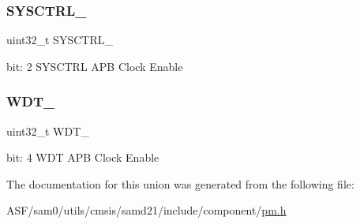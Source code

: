\subsubsection{\texorpdfstring{SYSCTRL\_}{SYSCTRL\_}}
{\footnotesize\ttfamily uint32\+\_\+t S\+Y\+S\+C\+T\+R\+L\+\_\+}

bit\+: 2 S\+Y\+S\+C\+T\+RL A\+PB Clock Enable \mbox{\label{union_p_m___a_p_b_a_m_a_s_k___type_a840c4ea01d6cdd40e18fc857d82b8db1}} 
\subsubsection{\texorpdfstring{WDT\_}{WDT\_}}
{\footnotesize\ttfamily uint32\+\_\+t W\+D\+T\+\_\+}

bit\+: 4 W\+DT A\+PB Clock Enable 

The documentation for this union was generated from the following file\+:\begin{DoxyCompactItemize}
\item 
A\+S\+F/sam0/utils/cmsis/samd21/include/component/\mbox{\hyperlink{component_2pm_8h}{pm.\+h}}\end{DoxyCompactItemize}
